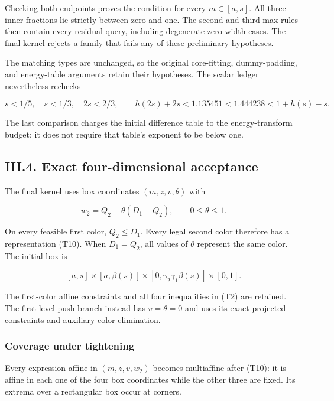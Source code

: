 Checking both endpoints proves the condition for every \(m\in[a,s]\). All three inner fractions lie strictly between zero and one. The second and third max rules then contain every residual query, including degenerate zero-width cases. The final kernel rejects a family that fails any of these preliminary hypotheses.

The matching types are unchanged, so the original core-fitting, dummy-padding, and energy-table arguments retain their hypotheses. The scalar ledger nevertheless rechecks

\[
s<1/5,\quad s<1/3,\quad 2s<2/3,\qquad
h(2s)+2s<1.135451<1.444238<1+h(s)-s.
\tag{T9}
\]

The last comparison charges the initial difference table to the energy-transform budget; it does not require that table's exponent to be below one.

\hypertarget{af-a9ec399514-iii.4.-exact-four-dimensional-acceptance}{%
\subsection{III.4. Exact four-dimensional acceptance}\label{af-a9ec399514-iii.4.-exact-four-dimensional-acceptance}}

The final kernel uses box coordinates \((m,z,v,\theta)\) with

\[
w_2=Q_2+\theta(D_1-Q_2),\qquad 0\le\theta\le1.
\tag{T10}
\]

On every feasible first color, \(Q_2\le D_1\). Every legal second color therefore has a representation (T10). When \(D_1=Q_2\), all values of \(\theta\) represent the same color. The initial box is

\[
[a,s]\times[a,\beta(s)]
 \times[0,\gamma_2\gamma_1\beta(s)]\times[0,1].
\]

The first-color affine constraints and all four inequalities in (T2) are retained. The first-level push branch instead has \(v=\theta=0\) and uses its exact projected constraints and auxiliary-color elimination.

\hypertarget{af-a9ec399514-coverage-under-tightening}{%
\subsubsection{Coverage under tightening}\label{af-a9ec399514-coverage-under-tightening}}

Every expression affine in \((m,z,v,w_2)\) becomes multiaffine after (T10): it is affine in each one of the four box coordinates while the other three are fixed. Its extrema over a rectangular box occur at corners.

